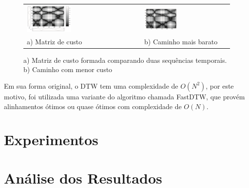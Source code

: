 \begin{figure}[h]
    \centering
    \caption{a) Matriz de custo formada comparando duas sequências temporais. b) Caminho com menor custo}
    \label{fig:dtw-caminho}
    \begin{tabular}{ll}
    \includegraphics[width=0.4\textwidth]{dados/figuras/dtw-comparacao.png} &
    \includegraphics[width=0.4\textwidth]{dados/figuras/dtw-comparacao-caminho.png} \\
    a) Matriz de custo & b) Caminho mais barato
    \end{tabular}
\end{figure}


Em sua forma original, o DTW tem uma complexidade de $ O(N^{2}) $, por este motivo, foi utilizada uma variante do algoritmo chamada FastDTW, que provém alinhamentos ótimos ou quase ótimos com complexidade de $O(N)$.


\section{Experimentos}
\label{sec:met-Experimentos}


\section{Análise dos Resultados}
\label{sec:met-analise}



